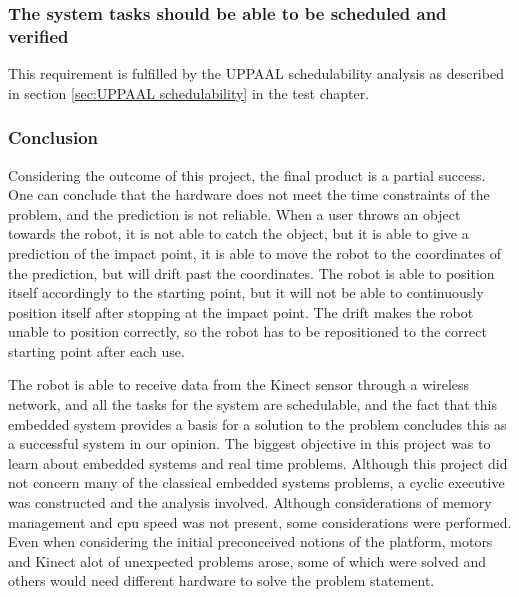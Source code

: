 \subsubsection{The system tasks should be able to be scheduled and verified}
This requirement is fulfilled by the UPPAAL schedulability analysis as described in section \ref{sec:UPPAAL schedulability} in the test chapter.


\subsubsection{Conclusion}
Considering the outcome of this project, the final product is a partial success. One can conclude that the hardware does not meet the time constraints of the problem, and the prediction is not reliable. When a user throws an object towards the robot, it is not able to catch the object, but it is able to give a prediction of the impact point, it is able to move the robot to the coordinates of the prediction, but will drift past the coordinates. The robot is able to position itself accordingly to the starting point, but it will not be able to continuously position itself after stopping at the impact point. The drift makes the robot unable to position correctly, so the robot has to be repositioned to the correct starting point after each use.\newline

The robot is able to receive data from the Kinect sensor through a wireless network, and all the tasks for the system are schedulable, and the fact that this embedded system provides a basis for a solution to the problem concludes this as a successful system in our opinion.
The biggest objective in this project was to learn about embedded systems and real time problems. Although this project did not concern many of the classical embedded systems problems, a cyclic executive was constructed and the analysis involved. Although considerations of memory management and cpu speed was not present, some considerations were performed. Even when considering the initial preconceived notions of the platform, motors and Kinect alot of unexpected problems arose, some of which were solved and others would need different hardware to solve the problem statement.  
